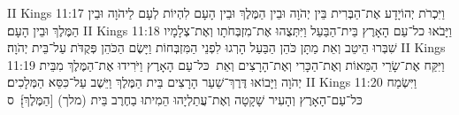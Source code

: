 II Kings 11:17	וַיִּכְרֹת יְהוֹיָדָע אֶת־הַבְּרִית בֵּין יְהֹוָה וּבֵין הַמֶּלֶךְ וּבֵין הָעָם לִהְיוֹת לְעָם לַיהֹוָה וּבֵין הַמֶּלֶךְ וּבֵין הָעָם׃
II Kings 11:18	וַיָּבֹאוּ כל־עַם הָאָרֶץ בֵּית־הַבַּעַל וַיִּתְּצֻהוּ אֶת־מִזְבְּחֹתָו וְאֶת־צְלָמָיו שִׁבְּרוּ הֵיטֵב וְאֵת מַתָּן כֹּהֵן הַבַּעַל הָרְגוּ לִפְנֵי הַמִּזְבְּחוֹת וַיָּשֶׂם הַכֹּהֵן פְּקֻדֹּת עַל־בֵּית יְהֹוָה׃
II Kings 11:19	וַיִּקַּח אֶת־שָׂרֵי הַמֵּאוֹת וְאֶת־הַכָּרִי וְאֶת־הָרָצִים וְאֵת  כּל־עַם הָאָרֶץ וַיֹּרִידוּ אֶת־הַמֶּלֶךְ מִבֵּית יְהֹוָה וַיָּבוֹאוּ דֶּרֶךְ־שַׁעַר הָרָצִים בֵּית הַמֶּלֶךְ וַיֵּשֶׁב עַל־כִּסֵּא הַמְּלָכִים׃
II Kings 11:20	וַיִּשְׂמַח כּל־עַם־הָאָרֶץ וְהָעִיר שָׁקָטָה וְאֶת־עֲתַלְיָהוּ הֵמִיתוּ בַחֶרֶב בֵּית (מלך) [הַמֶּלֶךְ]׃ {ס}        
